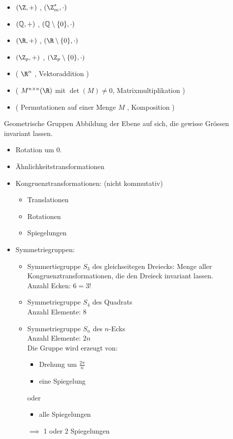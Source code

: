 \begin{bsp*}[head = Beispiele von Gruppen]
	\begin{itemize}
		\item $( \Z , + )$ , $( \Z_m^* , \cdot )$
		\item $( \mathbb{Q} , + )$ , $( \mathbb{Q} \setminus \{ 0 \} , \cdot )$
		\item $( \R , + )$ , $( \R \setminus \{ 0 \} , \cdot )$
		\item $( \Z_p , + )$ , $( \Z_p \setminus \{ 0 \} , \cdot )$
		\item ( $\R^n$ , Vektoraddition )
		\item ( $M^{n \times n}(\R)$ mit $\det(M) \neq 0$, Matrixmultiplikation )
		\item ( Permutationen auf einer Menge $M$ , Komposition )
	\end{itemize}
\end{bsp*}
\begin{def*}{Geometrische Gruppen}
	Abbildung der Ebene auf sich, die gewisse Grössen invariant lassen.
\end{def*}
\begin{bsp*}
	\begin{itemize}
		\item Rotation um 0.
		\item Ähnlichkeitstransformationen
		\item Kongruenztransformationen: (nicht kommutativ)
			\begin{itemize}
				\item Translationen
				\item Rotationen
				\item Spiegelungen
			\end{itemize}
		\item Symmetriegruppen:
			\begin{itemize}
				\item Symmertiegruppe $S_3$ des gleichseitegen Dreiecks: Menge aller Kongruenztransformationen, die den Dreieck invariant lassen. \\
					Anzahl Ecken: $6 = 3!$
				\item Symmetriegruppe $S_4$ des Quadrats \\
					Anzahl Elemente: 8
				\item Symmetriegruppe $S_n$ des $n$-Ecks \\
					Anzahl Elemente: $2n$ \\
					Die Gruppe wird erzeugt von:
						\begin{itemize}
							\item Drehung um $\frac{2\pi}{n}$
							\item eine Spiegelung
						\end{itemize}
						oder
						\begin{itemize}
							\item alle Spiegelungen
						\end{itemize}
						$\implies$ 1 oder 2 Spiegelungen
			\end{itemize}
	\end{itemize}
\end{bsp*}
